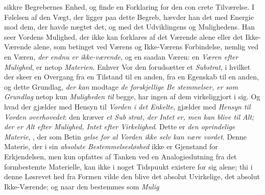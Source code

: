 sikkre Begrebernes Enhed, og finde en Forklaring for den con\-%
crete Tilværelse. I Følelsen af den Vægt, der ligger paa
dette Begreb, hævder han det med Energie mod dem, der
havde nægtet det, og med det Udviklingens og Mulighedens.
Han seer Vordens Mulighed, der ikke kan forklares af det
Værende alene eller det Ikke-Værende alene, som betinget ved
Værens og Ikke-Værens Forbindelse, nemlig ved en Væren,
\emph{der endnu er ikke-værende}, og en saadan Væren: en
\emph{Væren efter Mulighed}, er netop \emph{Materien}. Enhver Vor\-%
den forudsætter et \emph{Substrat}, i hvilket der skeer en Overgang
fra en Tilstand til en anden, fra en Egenskab til en anden,
og dette Grundlag, \emph{der kan} modtage \emph{de forskjellige Be\-%
stemmelser, er som Grundlag} netop kun \emph{Muligheden til}
begge, har ingen af dem virkeliggjort i sig. Og hvad der
gjælder med Hensyn til \emph{Vorden i det Enkelte}, gjælder med
\emph{Hensyn til Vorden overhovedet}: den kræver \emph{et Sub\-%
strat, der Intet er, men kan blive til Alt; der er
Alt efter Mulighed, Intet efter Virkelighed}. Dette
er \emph{den oprindelige Materie}, , der som Betin\-%
\emph{gelse for al Vorden ikke selv kan være vordet}. Denne
Materie, der i sin \emph{absolute Bestemmelsesløshed} ikke er
Gjenstand for Erkjendelsen, men kun opfattes af Tanken ved
en Analogieslutning fra det formbestemte Materielle, kan ikke
i noget Tidspuukt existere for sig alene; thi i denne Løsrevet\-%
hed fra Formen vilde den blive det absolut Uvirkelige, det
absolut Ikke-Værende; og naar den bestemmes som \emph{Mulig\-}%

